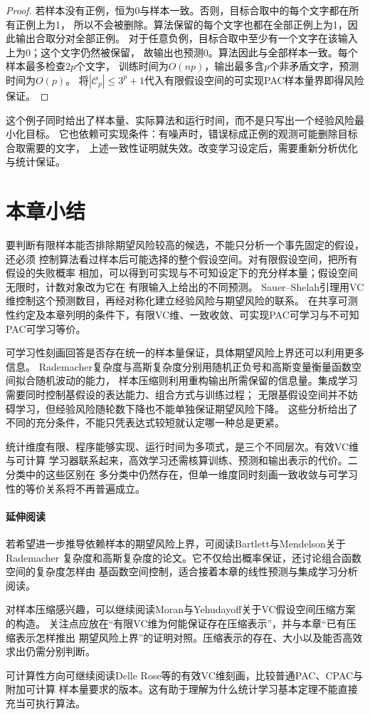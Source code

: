 \begin{proof}
若样本没有正例，恒为0与样本一致。否则，目标合取中的每个文字都在所有正例上为1，
所以不会被删除。算法保留的每个文字也都在全部正例上为1，因此输出合取分对全部正例。
对于任意负例，目标合取中至少有一个文字在该输入上为0；这个文字仍然被保留，
故输出也预测0。算法因此与全部样本一致。每个样本最多检查$2p$个文字，
训练时间为$O(np)$，输出最多含$p$个非矛盾文字，预测时间为$O(p)$。
将$|\mathcal C_p|\leq3^p+1$代入有限假设空间的可实现PAC样本量界即得风险保证。
\end{proof}

这个例子同时给出了样本量、实际算法和运行时间，而不是只写出一个经验风险最小化目标。
它也依赖可实现条件：有噪声时，错误标成正例的观测可能删除目标合取需要的文字，
上述一致性证明就失效。改变学习设定后，需要重新分析优化与统计保证。

\section{本章小结}
\label{sec:binary-learning-summary}

要判断有限样本能否排除期望风险较高的候选，不能只分析一个事先固定的假设，还必须
控制算法看过样本后可能选择的整个假设空间。对有限假设空间，把所有假设的失败概率
相加，可以得到可实现与不可知设定下的充分样本量；假设空间无限时，计数对象改为它在
有限输入上给出的不同预测。
Sauer--Shelah引理用VC维控制这个预测数目，再经对称化建立经验风险与期望风险的联系。
在共享可测性约定及本章列明的条件下，有限VC维、一致收敛、可实现PAC可学习与不可知PAC可学习等价。

可学习性刻画回答是否存在统一的样本量保证，具体期望风险上界还可以利用更多信息。
Rademacher复杂度与高斯复杂度分别用随机正负号和高斯变量衡量函数空间拟合随机波动的能力，
样本压缩则利用重构输出所需保留的信息量。集成学习需要同时控制基假设的表达能力、组合方式与训练过程；
无限基假设空间并不妨碍学习，但经验风险随轮数下降也不能单独保证期望风险下降。
这些分析给出了不同的充分条件，不能只凭表达式较短就认定哪一种总是更紧。

统计维度有限、程序能够实现、运行时间为多项式，是三个不同层次。有效VC维与可计算
学习器联系起来，高效学习还需核算训练、预测和输出表示的代价。二分类中的这些区别在
多分类中仍然存在，但单一维度同时刻画一致收敛与可学习性的等价关系将不再普遍成立。

\paragraph{延伸阅读}
若希望进一步推导依赖样本的期望风险上界，可阅读Bartlett与Mendelson关于Rademacher
复杂度和高斯复杂度的论文。它不仅给出概率保证，还讨论组合函数空间的复杂度怎样由
基函数空间控制，适合接着本章的线性预测与集成学习分析阅读。

对样本压缩感兴趣，可以继续阅读Moran与Yehudayoff关于VC假设空间压缩方案的构造。
关注点应放在“有限VC维为何能保证存在压缩表示”，并与本章“已有压缩表示怎样推出
期望风险上界”的证明对照。压缩表示的存在、大小以及能否高效求出仍需分别判断。

可计算性方向可继续阅读Delle Rose等的有效VC维刻画，比较普通PAC、CPAC与附加可计算
样本量要求的版本。这有助于理解为什么统计学习基本定理不能直接充当可执行算法。
